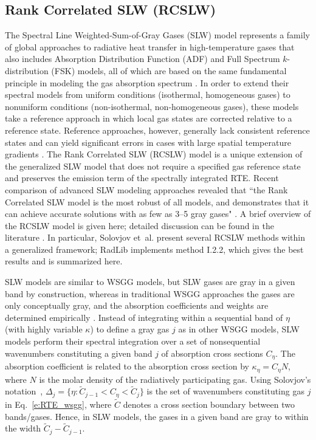 \documentclass[preprint,12pt, a4paper]{elsarticle}
\begin{document}
\subsection{Rank Correlated SLW (RCSLW)} \label{s:RCSLW}

The Spectral Line Weighted-Sum-of-Gray Gases (SLW) model represents a family of global approaches to radiative heat transfer in high-temperature gases that also includes Absorption Distribution Function (ADF) and Full Spectrum $k$-distribution (FSK) models, all of which are based on the same fundamental principle in modeling the gas absorption spectrum \cite{Solovjov_2016}. In order to extend their spectral models from uniform conditions (isothermal, homogeneous gases) to nonuniform conditions (non-isothermal, non-homogeneous gases), these models take a reference approach in which local gas states are corrected relative to a reference state. Reference approaches, however, generally lack consistent reference states and can yield significant errors in cases with large spatial temperature gradients \cite{Solovjov_2017}. The Rank Correlated SLW (RCSLW) model is a unique extension of the generalized SLW model that does not require a specified gas reference state and preserves the emission term of the spectrally integrated RTE. 
%
Recent comparison of advanced SLW modeling approaches revealed that ``the Rank Correlated SLW model is the most robust of all models, and demonstrates that it can achieve accurate solutions with as few as 3–5 gray gases" \citep{Badger_2019}. A brief overview of the RCSLW model is given here; detailed discussion can be found in the literature \cite{Solovjov_2000, Solovjov_2001, Solovjov_2008, Solovjov_2011, Solovjov_2014, Solovjov_2016, Solovjov_2017, Webb_2018}. 
In particular, Solovjov et~al. \cite{Solovjov_2017} present several RCSLW methods within a generalized framework; RadLib implements method I.2.2, which gives the best results and is summarized here.
%

SLW models are similar to WSGG models, but SLW gases are gray in a given band by construction, whereas in traditional WSGG approaches the gases are only conceptually gray, and the absorption coefficients and weights are determined empirically \cite{Badger_2019}. 
%
Instead of integrating within a sequential band of $\eta$ (with highly variable $\kappa$) to define a gray gas $j$ as in other WSGG models, SLW models perform their spectral integration over a set of nonsequential wavenumbers constituting a given band $j$ of absorption cross sections $C_\eta$.
%
The absorption coefficient is related to the absorption cross section by $\kappa_\eta=C_\eta N$, where $N$ is the molar density of the radiatively participating gas.
%
Using Solovjov's notation~\cite{Solovjov_2017}, $\Delta_j=\{\eta:\tilde{C}_{j-1}<C_\eta<\tilde{C}_j\}$ is the set of wavenumbers constituting gas $j$ in Eq.~\ref{e:RTE_wsgg}, where $\tilde{C}$ denotes a cross section boundary between two bands/gases.
%
Hence, in SLW models, the gases in a given band are gray to within the width $\tilde{C}_j-\tilde{C}_{j-1}$.
\end{document}
